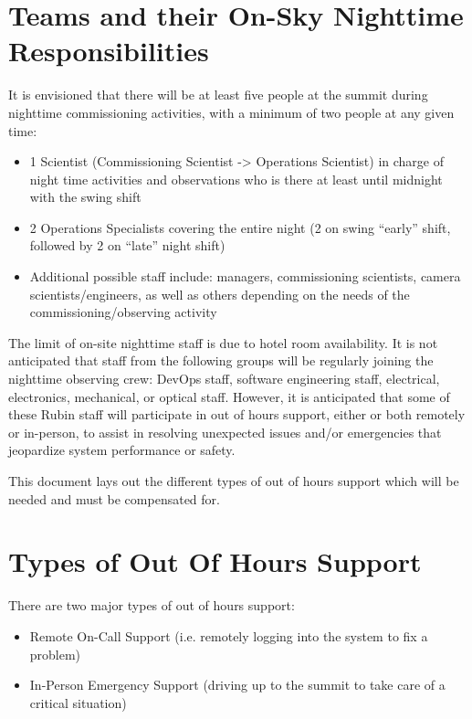 \section{Teams and their On-Sky Nighttime Responsibilities}

It is envisioned that there will be at least five people at the summit during nighttime commissioning activities, with a minimum of two people at any given time:

\begin{itemize}
    \item 1 Scientist (Commissioning Scientist -> Operations Scientist) in charge of night time activities and observations who is there at least until midnight with the swing shift
    \item 2 Operations Specialists covering the entire night (2 on swing ``early'' shift, followed by 2 on ``late'' night shift)
    \item Additional possible staff include: managers, commissioning scientists, camera scientists/engineers, as well as others depending on the needs of the commissioning/observing activity
\end{itemize}

The limit of on-site nighttime staff is due to hotel room availability.  It is not anticipated that staff from the following groups will be regularly joining the nighttime observing crew: DevOps staff, software engineering staff, electrical, electronics, mechanical, or optical staff.
However, it is anticipated that some of these Rubin staff will participate in out of hours support, either or both remotely or in-person, to assist in resolving unexpected issues and/or emergencies that jeopardize system performance or safety.

This document lays out the different types of out of hours support which will be needed and must be compensated for.

\section{Types of Out Of Hours Support}

There are two major types of out of hours support:

\begin{itemize}
    \item Remote On-Call Support (i.e. remotely logging into the system to fix a problem)
    \item In-Person Emergency Support (driving up to the summit to take care of a critical situation)
\end{itemize}

